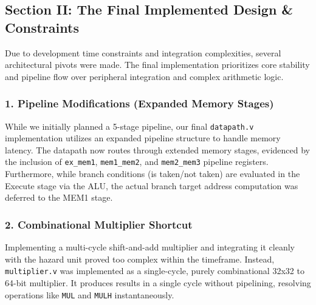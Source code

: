 \documentclass[11pt,a4paper]{article}
\begin{document}
\subsection*{Section II: The Final Implemented Design \& Constraints}

Due to development time constraints and integration complexities, several architectural pivots were made. The final implementation prioritizes core stability and pipeline flow over peripheral integration and complex arithmetic logic.

\subsubsection*{1. Pipeline Modifications (Expanded Memory Stages)}
While we initially planned a 5-stage pipeline, our final \texttt{datapath.v} implementation utilizes an expanded pipeline structure to handle memory latency. The datapath now routes through extended memory stages, evidenced by the inclusion of \texttt{ex\_mem1}, \texttt{mem1\_mem2}, and \texttt{mem2\_mem3} pipeline registers. Furthermore, while branch conditions (is taken/not taken) are evaluated in the Execute stage via the ALU, the actual branch target address computation was deferred to the MEM1 stage.

\subsubsection*{2. Combinational Multiplier Shortcut}
Implementing a multi-cycle shift-and-add multiplier and integrating it cleanly with the hazard unit proved too complex within the timeframe. Instead, \texttt{multiplier.v} was implemented as a single-cycle, purely combinational 32x32 to 64-bit multiplier. It produces results in a single cycle without pipelining, resolving operations like \texttt{MUL} and \texttt{MULH} instantaneously.
\end{document}
